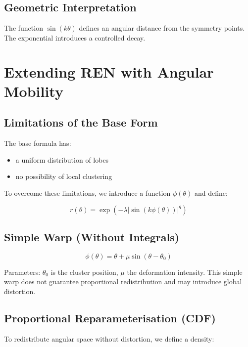\documentclass[11pt,a4paper]{article}
\begin{document}
\subsection{Geometric Interpretation}

The function $\sin(k\theta)$ defines an angular distance from the symmetry points.
The exponential introduces a controlled decay.

\section{Extending REN with Angular Mobility}

\subsection{Limitations of the Base Form}

The base formula has:
\begin{itemize}
    \item a uniform distribution of lobes
    \item no possibility of local clustering
\end{itemize}

To overcome these limitations, we introduce a function $\phi(\theta)$ and define:

\begin{equation}
r(\theta) = \exp\left(-\lambda \left| \sin(k\phi(\theta)) \right|^q \right)
\end{equation}

\subsection{Simple Warp (Without Integrals)}

\begin{equation}
\phi(\theta) = \theta + \mu \sin(\theta - \theta_0)
\end{equation}

Parameters: $\theta_0$ is the cluster position, $\mu$ the deformation
intensity. This simple warp does not guarantee proportional
redistribution and may introduce global distortion.

\subsection{Proportional Reparameterisation (CDF)}

To redistribute angular space without distortion, we define a density:
\end{document}
